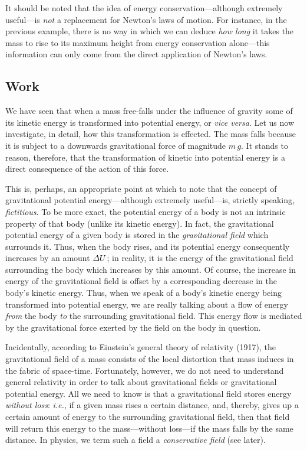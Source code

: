 It should be noted that the idea of energy conservation---although extremely useful---is
{\em not} a replacement for Newton's laws of motion. For instance, in the previous example, there
is no way in which we can deduce {\em how long} it takes the mass to rise to its
maximum height from energy conservation alone---this information can only come from the 
direct application of Newton's laws.

\subsection{Work}
We have seen that when a mass free-falls under the influence of gravity some
of its kinetic energy is transformed into potential energy, or {\em vice versa}. 
Let us now investigate, in detail, how this transformation is effected. 
The mass falls because it is subject to a downwards gravitational force of magnitude
$m\,g$. It stands to reason, therefore, that the transformation of kinetic into potential
energy is a direct consequence of the action of this force. 

This is, perhaps,
an appropriate point at which to note that the concept of gravitational potential energy---although 
extremely useful---is, strictly speaking, {\em fictitious}.
To be more exact, the potential energy of a body is not 
an intrinsic property of that body (unlike its kinetic energy). In fact, the
gravitational  potential energy of
a given body is stored in the {\em gravitational field} which surrounds it. Thus,
when the body rises, and its potential energy consequently increases by an amount
${\mit\Delta}U$; in reality, it is 
the energy of the gravitational field surrounding the body which increases by this amount.
Of course, the increase in energy of the gravitational field is offset by a corresponding decrease in the
body's kinetic energy. Thus, when we speak of a body's kinetic energy being transformed
into potential energy, we are really talking about a flow of energy {\em from} the body {\em to}
the surrounding gravitational field. This energy flow is mediated by the
gravitational force exerted by the field on the body in question. 

Incidentally,
according to Einstein's general theory of relativity (1917), the gravitational field
of a mass consists of the local distortion that mass induces in the fabric of space-time. Fortunately,
however,
we do not need to understand general relativity in order to talk about gravitational fields or
gravitational potential energy. All we need to know is that a gravitational field stores
energy {\em without loss}: {\em i.e.}, if a given mass rises a certain distance, and, thereby,
gives up a certain amount of energy to the surrounding gravitational field, then that
 field will return this energy to the mass---without
loss---if the
mass falls by the same distance. In physics, we term such a field a {\em conservative field}
(see later). 

